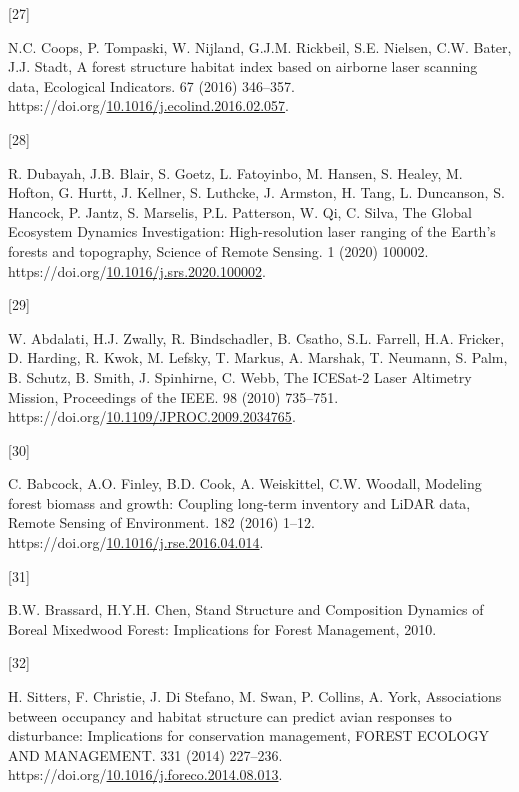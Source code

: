 \documentclass[manuscript, 3p, authoryear]{elsarticle} %
\newlength{\cslhangindent}
\newlength{\csllabelwidth}
\newlength{\cslentryspacingunit} %
\newenvironment{CSLReferences}[2] %
 {%
  \setlength{\parindent}{0pt}
  \ifodd #1
  \let\oldpar\par
  \def\par{\hangindent=\cslhangindent\oldpar}
  \fi
  \setlength{\parskip}{#2\cslentryspacingunit}
 }%
 {}
\newcommand{\CSLLeftMargin}[1]{\parbox[t]{\csllabelwidth}{#1}}
\newcommand{\CSLRightInline}[1]{\parbox[t]{\linewidth - \csllabelwidth}{#1}\break}
\begin{document}
\begin{CSLReferences}{0}{0}
\leavevmode{}%
\CSLLeftMargin{{[}27{]} }%
\CSLRightInline{N.C. Coops, P. Tompaski, W. Nijland, G.J.M. Rickbeil, S.E. Nielsen, C.W. Bater, J.J. Stadt, A forest structure habitat index based on airborne laser scanning data, Ecological Indicators. 67 (2016) 346--357. https://doi.org/\href{https://doi.org/10.1016/j.ecolind.2016.02.057}{10.1016/j.ecolind.2016.02.057}.}

\leavevmode{}%
\CSLLeftMargin{{[}28{]} }%
\CSLRightInline{R. Dubayah, J.B. Blair, S. Goetz, L. Fatoyinbo, M. Hansen, S. Healey, M. Hofton, G. Hurtt, J. Kellner, S. Luthcke, J. Armston, H. Tang, L. Duncanson, S. Hancock, P. Jantz, S. Marselis, P.L. Patterson, W. Qi, C. Silva, The {Global Ecosystem Dynamics Investigation}: {High-resolution} laser ranging of the {Earth}'s forests and topography, Science of Remote Sensing. 1 (2020) 100002. https://doi.org/\href{https://doi.org/10.1016/j.srs.2020.100002}{10.1016/j.srs.2020.100002}.}

\leavevmode{}%
\CSLLeftMargin{{[}29{]} }%
\CSLRightInline{W. Abdalati, H.J. Zwally, R. Bindschadler, B. Csatho, S.L. Farrell, H.A. Fricker, D. Harding, R. Kwok, M. Lefsky, T. Markus, A. Marshak, T. Neumann, S. Palm, B. Schutz, B. Smith, J. Spinhirne, C. Webb, The {ICESat-2 Laser Altimetry Mission}, Proceedings of the IEEE. 98 (2010) 735--751. https://doi.org/\href{https://doi.org/10.1109/JPROC.2009.2034765}{10.1109/JPROC.2009.2034765}.}

\leavevmode{}%
\CSLLeftMargin{{[}30{]} }%
\CSLRightInline{C. Babcock, A.O. Finley, B.D. Cook, A. Weiskittel, C.W. Woodall, Modeling forest biomass and growth: {Coupling} long-term inventory and {LiDAR} data, Remote Sensing of Environment. 182 (2016) 1--12. https://doi.org/\href{https://doi.org/10.1016/j.rse.2016.04.014}{10.1016/j.rse.2016.04.014}.}

\leavevmode{}%
\CSLLeftMargin{{[}31{]} }%
\CSLRightInline{B.W. Brassard, H.Y.H. Chen, Stand {Structure} and {Composition Dynamics} of {Boreal Mixedwood Forest}: {Implications} for {Forest Management}, 2010.}

\leavevmode{}%
\CSLLeftMargin{{[}32{]} }%
\CSLRightInline{H. Sitters, F. Christie, J. Di Stefano, M. Swan, P. Collins, A. York, Associations between occupancy and habitat structure can predict avian responses to disturbance: {Implications} for conservation management, FOREST ECOLOGY AND MANAGEMENT. 331 (2014) 227--236. https://doi.org/\href{https://doi.org/10.1016/j.foreco.2014.08.013}{10.1016/j.foreco.2014.08.013}.}


\end{CSLReferences}
\end{document}
